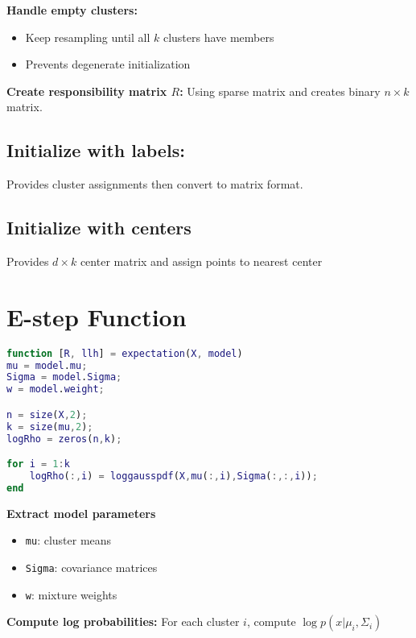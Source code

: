 \documentclass[11pt]{article}
\begin{document}
\begin{minipage}{\textwidth}
\begin{minipage}[t]{0.48\textwidth}
\textbf{Handle empty clusters:}
\begin{itemize}
\item Keep resampling until all $k$ clusters have members
\item Prevents degenerate initialization
\end{itemize}

\textbf{Create responsibility matrix $R$:} Using sparse matrix and
creates binary $n \times k$ matrix.

\subsection{Initialize with labels:} Provides cluster assignments
then convert to matrix format.

\subsection{Initialize with centers}
Provides $d \times k$ center matrix and assign points to nearest center
\end{minipage}
\end{minipage}

\vspace{0.5cm}


\section{E-step Function}

\begin{minipage}{\textwidth}
\begin{minipage}[t]{0.48\textwidth}
\begin{lstlisting}[language=Matlab, firstnumber=87]
function [R, llh] = expectation(X, model)
mu = model.mu;
Sigma = model.Sigma;
w = model.weight;

n = size(X,2);
k = size(mu,2);
logRho = zeros(n,k);

for i = 1:k
    logRho(:,i) = loggausspdf(X,mu(:,i),Sigma(:,:,i));
end
\end{lstlisting}
\end{minipage}
\hfill
\begin{minipage}[t]{0.48\textwidth}

\textbf{Extract model parameters}
\begin{itemize}
\item \texttt{mu}: cluster means
\item \texttt{Sigma}: covariance matrices
\item \texttt{w}: mixture weights
\end{itemize}

\textbf{Compute log probabilities:}
For each cluster $i$, compute $\log p(x|\mu_i,\Sigma_i)$
\end{minipage}
\end{minipage}
\end{document}
